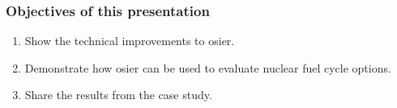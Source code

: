 \begin{frame}
    \frametitle{Objectives of this presentation}
    \begin{enumerate}
        \item Show the technical improvements to \gls{osier}.
        \item Demonstrate how \gls{osier} can be used to evaluate nuclear fuel cycle options.
        \item Share the results from the case study.
    \end{enumerate}
\end{frame}